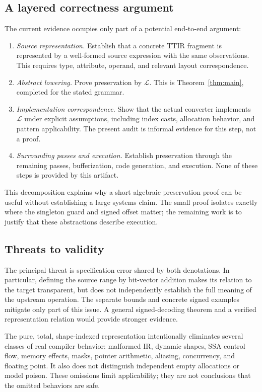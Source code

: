 \documentclass[a4paper,USenglish,anonymous]{lipics-v2021}
\newcommand{\lo}{\mathcal{L}}
\begin{document}
\subsection{A layered correctness argument}
The current evidence occupies only part of a potential end-to-end argument:
\begin{enumerate}
\item \emph{Source representation.} Establish that a concrete TTIR fragment
is represented by a well-formed source expression with the same observations.
This requires type, attribute, operand, and relevant layout correspondence.
\item \emph{Abstract lowering.} Prove preservation by $\lo$. This is
Theorem~\ref{thm:main}, completed for the stated grammar.
\item \emph{Implementation correspondence.} Show that the actual converter
implements $\lo$ under explicit assumptions, including index casts,
allocation behavior, and pattern applicability. The present audit is
informal evidence for this step, not a proof.
\item \emph{Surrounding passes and execution.} Establish preservation
through the remaining passes, bufferization, code generation, and execution.
None of these steps is provided by this artifact.
\end{enumerate}
This decomposition explains why a short algebraic preservation proof can
be useful without establishing a large systems claim. The small proof
isolates exactly where the singleton guard and signed offset matter; the
remaining work is to justify that these abstractions describe execution.

\subsection{Threats to validity}
The principal threat is specification error shared by both denotations.
In particular, defining the source range by bit-vector addition makes
its relation to the target transparent, but does not independently
establish the full meaning of the upstream operation. The separate bounds
and concrete signed examples mitigate only part of this issue. A general
signed-decoding theorem and a verified representation relation would
provide stronger evidence.

The pure, total, shape-indexed representation intentionally eliminates
several classes of real compiler behavior: malformed IR, dynamic shapes,
SSA control flow, memory effects, masks, pointer arithmetic, aliasing,
concurrency, and floating point. It also does not distinguish independent
empty allocations or model poison. These omissions limit applicability;
they are not conclusions that the omitted behaviors are safe.
\end{document}
